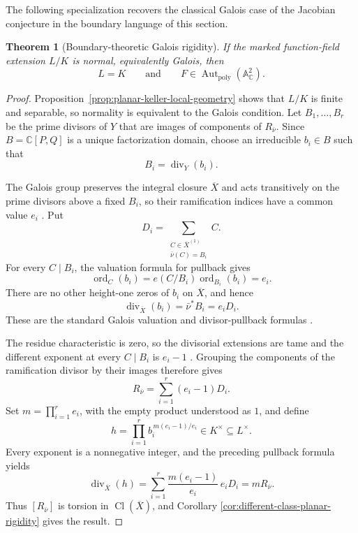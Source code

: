 \documentclass[11pt]{article}
\newtheorem{theorem}{Theorem}[section]
\theoremstyle{remark}
\theoremstyle{definition}
\DeclareMathOperator{\Aut}{Aut}
\newcommand{\A}{\mathbb A}
\newcommand{\C}{\mathbb C}
\begin{document}
The following specialization recovers the classical Galois case of the
Jacobian conjecture \cite{Campbell1973,Razar1979,Wright1981} in the boundary
language of this section.

\begin{theorem}[Boundary-theoretic Galois rigidity]
\label{thm:planar-galois-rigidity}
If the marked function-field extension \(L/K\) is normal, equivalently
Galois, then
\[
  L=K
  \qquad\text{and}\qquad
  F\in\Aut_{\mathrm{poly}}(\A^2_{\C}).
\]
\end{theorem}

\begin{proof}
Proposition~\ref{prop:planar-keller-local-geometry} shows that \(L/K\) is
finite and separable, so normality is equivalent to the Galois condition.
Let \(B_1,\dots,B_r\) be the prime divisors of \(Y\) that are images of
components of \(R_{\bar\nu}\).  Since \(B=\C[P,Q]\) is a unique
factorization domain, choose an irreducible \(b_i\in B\) such that
\[
  B_i=\operatorname{div}_Y(b_i).
\]

The Galois group preserves the integral closure \(\overline X\) and acts
transitively on the prime divisors above a fixed \(B_i\), so their
ramification indices have a common value \(e_i\)
\cite{StacksGaloisIntegralClosure}.  Put
\[
  D_i=
  \sum_{\substack{C\in\overline X^{(1)}\\ \bar\nu(C)=B_i}} C.
\]
For every \(C\mid B_i\), the valuation formula for pullback gives
\[
  \operatorname{ord}_C(b_i)
  =e(C/B_i)\operatorname{ord}_{B_i}(b_i)=e_i.
\]
There are no other height-one zeros of \(b_i\) on \(\overline X\), and
hence
\[
  \operatorname{div}_{\overline X}(b_i)
  =\bar\nu^*B_i=e_iD_i.
\]
These are the standard Galois valuation and divisor-pullback formulas
\cite{StacksDVRExtensions,StacksRamificationTheory}.

The residue characteristic is zero, so the divisorial extensions are tame
and the different exponent at every \(C\mid B_i\) is \(e_i-1\)
\cite{StacksRiemannHurwitzTame}.  Grouping
the components of the ramification divisor by their images therefore gives
\[
  R_{\bar\nu}=\sum_{i=1}^r(e_i-1)D_i.
\]
Set \(m=\prod_{i=1}^r e_i\), with the empty product understood as \(1\),
and define
\[
  h=\prod_{i=1}^r b_i^{\,m(e_i-1)/e_i}\in K^\times\subseteq L^\times.
\]
Every exponent is a nonnegative integer, and the preceding pullback formula
yields
\[
  \operatorname{div}_{\overline X}(h)
  =\sum_{i=1}^r\frac{m(e_i-1)}{e_i}\,e_iD_i
  =mR_{\bar\nu}.
\]
Thus \([R_{\bar\nu}]\) is torsion in
\(\operatorname{Cl}(\overline X)\), and Corollary
\ref{cor:different-class-planar-rigidity} gives the result.
\end{proof}
\end{document}
